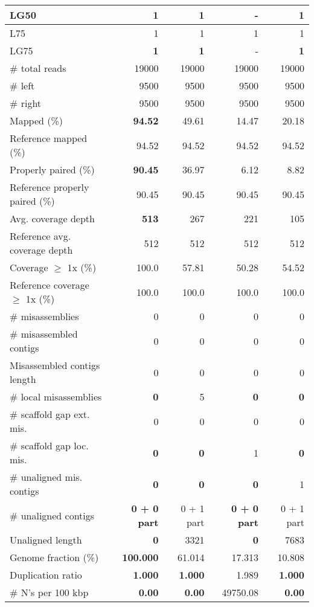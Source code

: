 \documentclass[12pt,a4paper]{article}
\begin{document}
\begin{table}[ht]
\begin{center}
\begin{tabular}{|l*{4}{|r}|}
LG50 & {\bf 1} & {\bf 1} & - & {\bf 1} \\ \hline
L75 & 1 & 1 & 1 & 1 \\ \hline
LG75 & {\bf 1} & {\bf 1} & - & {\bf 1} \\ \hline
\# total reads & 19000 & 19000 & 19000 & 19000 \\ \hline
\# left & 9500 & 9500 & 9500 & 9500 \\ \hline
\# right & 9500 & 9500 & 9500 & 9500 \\ \hline
Mapped (\%) & {\bf 94.52} & 49.61 & 14.47 & 20.18 \\ \hline
Reference mapped (\%) & 94.52 & 94.52 & 94.52 & 94.52 \\ \hline
Properly paired (\%) & {\bf 90.45} & 36.97 & 6.12 & 8.82 \\ \hline
Reference properly paired (\%) & 90.45 & 90.45 & 90.45 & 90.45 \\ \hline
Avg. coverage depth & {\bf 513} & 267 & 221 & 105 \\ \hline
Reference avg. coverage depth & 512 & 512 & 512 & 512 \\ \hline
Coverage $\geq$ 1x (\%) & 100.0 & 57.81 & 50.28 & 54.52 \\ \hline
Reference coverage $\geq$ 1x (\%) & 100.0 & 100.0 & 100.0 & 100.0 \\ \hline
\# misassemblies & 0 & 0 & 0 & 0 \\ \hline
\# misassembled contigs & 0 & 0 & 0 & 0 \\ \hline
Misassembled contigs length & 0 & 0 & 0 & 0 \\ \hline
\# local misassemblies & {\bf 0} & 5 & {\bf 0} & {\bf 0} \\ \hline
\# scaffold gap ext. mis. & 0 & 0 & 0 & 0 \\ \hline
\# scaffold gap loc. mis. & {\bf 0} & {\bf 0} & 1 & {\bf 0} \\ \hline
\# unaligned mis. contigs & {\bf 0} & {\bf 0} & {\bf 0} & 1 \\ \hline
\# unaligned contigs & {\bf 0 + 0 part} & 0 + 1 part & {\bf 0 + 0 part} & 0 + 1 part \\ \hline
Unaligned length & {\bf 0} & 3321 & {\bf 0} & 7683 \\ \hline
Genome fraction (\%) & {\bf 100.000} & 61.014 & 17.313 & 10.808 \\ \hline
Duplication ratio & {\bf 1.000} & {\bf 1.000} & 1.989 & {\bf 1.000} \\ \hline
\# N's per 100 kbp & {\bf 0.00} & {\bf 0.00} & 49750.08 & {\bf 0.00} \\ \hline

\end{tabular}
\end{center}
\end{table}
\end{document}
